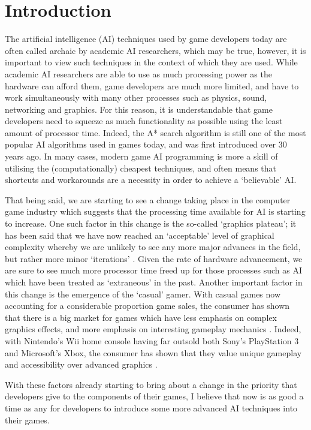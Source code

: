 \documentclass[a4paper,oneside]{report}
\begin{document}
%
%

\chapter{Introduction}

The artificial intelligence (AI) techniques used by game developers today are often called archaic by academic AI researchers, which may be true, however, it is important to view such techniques in the context of which they are used. While academic AI researchers are able to use as much processing power as the hardware can afford them, game developers are much more limited, and have to work simultaneously with many other processes such as physics, sound, networking and graphics. For this reason, it is understandable that game developers need to squeeze as much functionality as possible using the least amount of processor time. Indeed, the A* search algorithm is still one of the most popular AI algorithms used in games today, and was first introduced over 30 years ago. In many cases, modern game AI programming is more a skill of utilising the (computationally) cheapest techniques, and often means that shortcuts and workarounds are a necessity in order to achieve a `believable' AI. 

That being said, we are starting to see a change taking place in the computer game industry which suggests that the processing time available for AI is starting to increase. One such factor in this change is the so-called `graphics plateau'; it has been said that we have now reached an `acceptable' level of graphical complexity whereby we are unlikely to see any more major advances in the field, but rather more minor `iterations' \cite{Sheffield:2008fk}. Given the rate of hardware advancement, we are sure to see much more processor time freed up for those processes such as AI which have been treated as `extraneous' in the past. Another important factor in this change is the emergence of the `casual' gamer. With casual games now accounting for a considerable proportion game sales, the consumer has shown that there is a big market for games which have less emphasis on complex graphics effects, and more emphasis on interesting gameplay mechanics \cite{Association:2011uq}. Indeed, with Nintendo's Wii home console having far outsold both Sony's PlayStation 3 and Microsoft's Xbox, the consumer has shown that they value unique gameplay and accessibility over advanced graphics \cite{:2012dq, Nintendo:2012nx, :cr}. 

With these factors already starting to bring about a change in the priority that developers give to the components of their games, I believe that now is as good a time as any for developers to introduce some more advanced AI techniques into their games.
\end{document}
